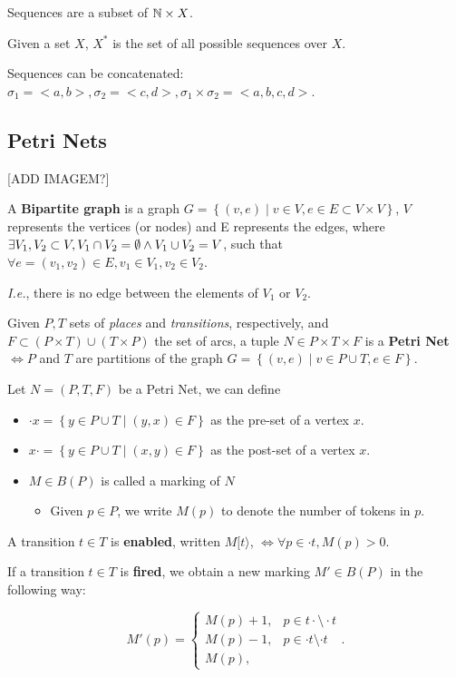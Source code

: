 Sequences are a subset of $\mathbb{N} \times X$.

\begin{definition}
	Given a set $X$, $X^*$ is the set of all possible sequences over $X$.
\end{definition}

Sequences can be concatenated: $\sigma_1= <a,b>, \sigma_2= <c,d>, \sigma_1 \times \sigma_2 = <a,b,c,d>$.

\subsection*{Petri Nets}

[ADD IMAGEM?]

\begin{definition}
	A \textbf{Bipartite graph} is a graph $G=\left\{ \left( v,e \right) \mid v \in V, e \in E\subset V\times V \right\} $, $V$ represents the vertices (or nodes) and E represents the edges, where $\exists V_1,V_2\subset V, V_1\cap V_2 = \emptyset \land V_1 \cup V_2 = V$, such that $\forall e=(v_1,v_2) \in E, v_1 \in V_1, v_2\in V_2$.
\end{definition}

\emph{I.e.}, there is no edge between the elements of $V_1$ or $V_2$.

\begin{definition}
	Given $P, T$ sets of \emph{places} and \emph{transitions}, respectively, and $F\subset \left( P\times T \right) \cup \left( T\times P \right) $ the set of arcs, a tuple $N \in P\times T\times F$ is a \textbf{Petri Net} $\iff P$ and $T$ are partitions of the graph $G=\left\{ \left( v,e \right)  \mid v\in P\cup T, e \in F\right\} $.
\end{definition}

Let $N=\left( P,T,F \right) $ be a Petri Net, we can define

\begin{itemize}
	\item $\cdot x=\left\{ y\in P\cup T \mid \left( y,x \right) \in F \right\} $ as the pre-set of a vertex $x$.
	\item $x\cdot =\left\{ y\in P\cup T \mid (x,y)\in F \right\} $ as the post-set of a vertex $x$.
	\item $M\in B(P)$ is called a marking of $N$
		 \begin{itemize}
			 \item Given $p \in P$, we write $M(p)$ to denote the number of tokens in $p$.
		\end{itemize}
\end{itemize}

\begin{definition}
	A transition $t\in T$ is \textbf{enabled}, written $M[t\rangle$,  $\iff \forall p \in \cdot t, M(p)>0$.
\end{definition}


If a transition $t\in T$ is \textbf{fired}, we obtain a new marking $M' \in B(P)$ in the following way:

\[
M'(p) =
\begin{cases}
	M(p)+1, & p \in t\cdot \setminus \cdot t \\
	M(p)-1, & p \in \cdot t \setminus \cdot t \\
	M(p),
\end{cases}
.\] 
